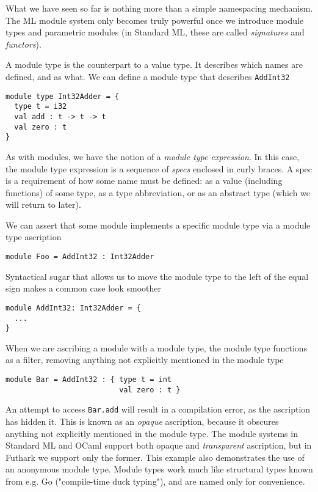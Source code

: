 \documentclass[oneside,11pt]{book}
\begin{document}
What we have seen so far is nothing more than a simple namespacing
mechanism.  The ML module system only becomes truly powerful once we
introduce module types and parametric modules (in Standard ML, these
are called \textit{signatures} and \textit{functors}).

A module type is the counterpart to a value type.  It describes which
names are defined, and as what.  We can define a module type that
describes \texttt{AddInt32}

\begin{lstlisting}
module type Int32Adder = {
  type t = i32
  val add : t -> t -> t
  val zero : t
}
\end{lstlisting}

As with modules, we have the notion of a \textit{module type expression}.  In
this case, the module type expression is a sequence of \textit{specs}
enclosed in curly braces.  A spec is a requirement of how some name
must be defined: as a value (including functions) of some type, as a
type abbreviation, or as an abstract type (which we will return to
later).

We can assert that some module implements a specific module type via
a module type ascription

\begin{lstlisting}
module Foo = AddInt32 : Int32Adder
\end{lstlisting}

Syntactical sugar that allows us to move the module type to the left
of the equal sign makes a common case look smoother

\begin{lstlisting}
module AddInt32: Int32Adder = {
  ...
}
\end{lstlisting}

When we are ascribing a module with a module type, the module type
functions as a filter, removing anything not explicitly mentioned in
the module type

\begin{lstlisting}
module Bar = AddInt32 : { type t = int
                          val zero : t }
\end{lstlisting}

An attempt to access \texttt{Bar.add} will result in a compilation
error, as the ascription has hidden it.  This is known as an
\textit{opaque} ascription, because it obscures anything not
explicitly mentioned in the module type.  The module systems in
Standard ML and OCaml support both opaque and \textit{transparent}
ascription, but in Futhark we support only the former.  This example
also demonstrates the use of an anonymous module type.  Module types
work much like structural types known from e.g. Go ("compile-time duck
typing"), and are named only for convenience.
\end{document}
